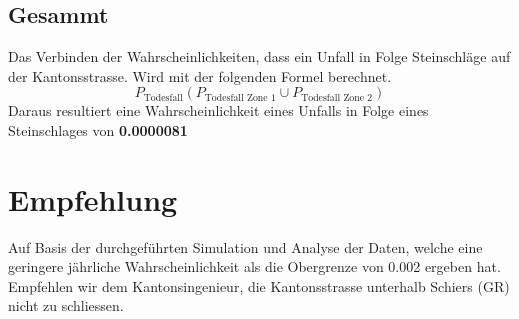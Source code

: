 \documentclass[
  letterpaper,
  DIV=11,
  numbers=noendperiod]{scrartcl}
\begin{document}
\subsection{Gesammt}\label{gesammt}

Das Verbinden der Wahrscheinlichkeiten, dass ein Unfall in Folge
Steinschläge auf der Kantonsstrasse. Wird mit der folgenden Formel
berechnet. \[
P_{\text{Todesfall}}(P_{\text{Todesfall Zone 1}} \cup P_{\text{Todesfall Zone 2}})
\] Daraus resultiert eine Wahrscheinlichkeit eines Unfalls in Folge
eines Steinschlages von \textbf{0.0000081}

\section{Empfehlung}\label{empfehlung}

Auf Basis der durchgeführten Simulation und Analyse der Daten, welche
eine geringere jährliche Wahrscheinlichkeit als die Obergrenze von 0.002
ergeben hat. Empfehlen wir dem Kantonsingenieur, die Kantonsstrasse
unterhalb Schiers (GR) nicht zu schliessen.
\end{document}
